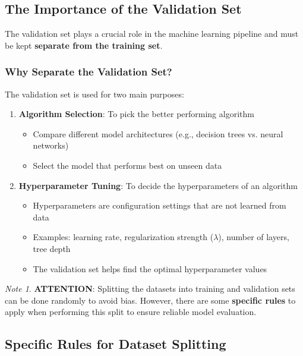 \documentclass[11pt,a4paper]{article}
\theoremstyle{definition}
\theoremstyle{plain}
\theoremstyle{remark}
\newtheorem*{remark}{Note}
\begin{document}
\subsection{The Importance of the Validation Set}

The validation set plays a crucial role in the machine learning pipeline and must be kept \textbf{separate from the training set}.

\subsubsection{Why Separate the Validation Set?}

The validation set is used for two main purposes:

\begin{enumerate}
    \item \textbf{Algorithm Selection}: To pick the better performing algorithm
    \begin{itemize}
        \item Compare different model architectures (e.g., decision trees vs. neural networks)
        \item Select the model that performs best on unseen data
    \end{itemize}
    
    \item \textbf{Hyperparameter Tuning}: To decide the hyperparameters of an algorithm
    \begin{itemize}
        \item Hyperparameters are configuration settings that are not learned from data
        \item Examples: learning rate, regularization strength ($\lambda$), number of layers, tree depth
        \item The validation set helps find the optimal hyperparameter values
    \end{itemize}
\end{enumerate}

\begin{remark}
\textbf{ATTENTION}: Splitting the datasets into training and validation sets can be done randomly to avoid bias. However, there are some \textbf{specific rules} to apply when performing this split to ensure reliable model evaluation.
\end{remark}

\subsection{Specific Rules for Dataset Splitting}
\end{document}

